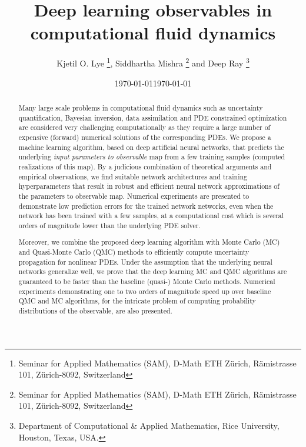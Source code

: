 \documentclass[a4paper]{article}
\numberwithin{equation}{section}
\numberwithin{equation}{section}
\theoremstyle{definition}
\theoremstyle{myremarkstyle}
\begin{document}
\date{\today}

\title{Deep learning observables in computational fluid dynamics}


\author{Kjetil O. Lye \thanks{Seminar for Applied Mathematics (SAM), D-Math \newline
  ETH Z\"urich, R\"amistrasse 101, 
  Z\"urich-8092, Switzerland}, Siddhartha Mishra \thanks{Seminar for Applied Mathematics (SAM), D-Math \newline
  ETH Z\"urich, R\"amistrasse 101, 
  Z\"urich-8092, Switzerland} and Deep Ray \thanks{Department of Computational \& Applied Mathematics, Rice University, Houston, Texas, USA.}}



\date{\today}

\maketitle
\begin{abstract}
Many large scale problems in computational fluid dynamics such as uncertainty quantification, Bayesian inversion, data assimilation and PDE constrained optimization are considered very challenging computationally as they require a large number of expensive (forward) numerical solutions of the corresponding PDEs. We propose a machine learning algorithm, based on deep artificial neural networks, that predicts the underlying \emph{input parameters to observable} map from a few training samples (computed realizations of this map). By a judicious combination of theoretical arguments and empirical observations, we find suitable network architectures and training hyperparameters that result in robust and efficient neural network approximations of the parameters to observable map. Numerical experiments are presented to demonstrate low prediction errors for the trained network networks, even when the network has been trained with a few samples, at a computational cost which is several orders of magnitude lower than the underlying PDE solver. 

Moreover, we combine the proposed deep learning algorithm with Monte Carlo (MC) and Quasi-Monte Carlo (QMC) methods to efficiently compute uncertainty propagation for nonlinear PDEs. Under the assumption that the underlying neural networks generalize well, we prove that the deep learning MC and QMC algorithms are guaranteed to be faster than the baseline (quasi-) Monte Carlo methods. Numerical experiments demonstrating one to two orders of magnitude speed up over baseline QMC and MC algorithms, for the intricate problem of computing probability distributions of the observable, are also presented.  



\end{abstract}
\end{document}
